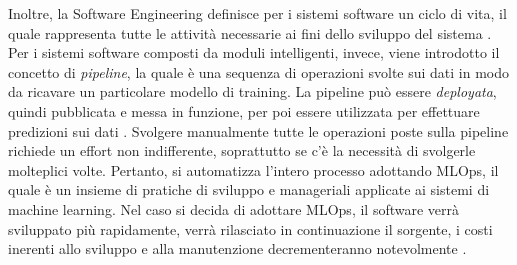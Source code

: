 Inoltre, la Software Engineering definisce per i sistemi software un ciclo di vita, il quale rappresenta tutte le attività necessarie ai fini dello sviluppo del sistema \cite{bruegge2009object}. Per i sistemi software composti da moduli intelligenti, invece, viene introdotto il concetto di \emph{pipeline}, la quale è una sequenza di operazioni svolte sui dati in modo da ricavare un particolare modello di training. La pipeline può essere \emph{deployata}, quindi pubblicata e messa in funzione, per poi essere utilizzata per effettuare predizioni sui dati \cite{burkov2020machine}. Svolgere manualmente tutte le operazioni poste sulla pipeline richiede un effort non indifferente, soprattutto se c'è la necessità di svolgerle molteplici volte. Pertanto, si automatizza l'intero processo adottando MLOps, il quale è un insieme di pratiche di sviluppo e manageriali applicate ai sistemi di machine learning. Nel caso si decida di adottare MLOps, il software verrà sviluppato più rapidamente, verrà rilasciato in continuazione il sorgente, i costi inerenti allo sviluppo e alla manutenzione decrementeranno notevolmente \cite{alla2021mlops}.


